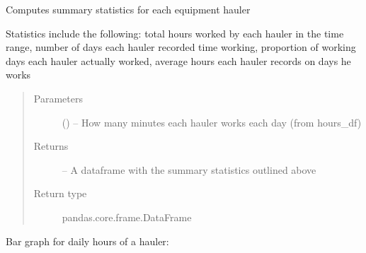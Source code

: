 \documentclass[letterpaper,10pt,english]{sphinxmanual}
\begin{document}
\begin{fulllineitems}
\label{\detokenize{reporting:reporting.summarize}}
Computes summary statistics for each equipment hauler

Statistics include the following: total hours worked by each hauler in
the time range, number of days each hauler recorded time working,
proportion of working days each hauler actually worked, average hours
each hauler records on days he works
\begin{quote}\begin{description}
\item[{Parameters}] \leavevmode
{} () -- How many minutes each hauler works each day (from hours\_df)

\item[{Returns}] \leavevmode
{} -- A dataframe with the summary statistics outlined above

\item[{Return type}] \leavevmode
pandas.core.frame.DataFrame

\end{description}\end{quote}

\end{fulllineitems}


Bar graph for daily hours of a hauler:
\end{document}
